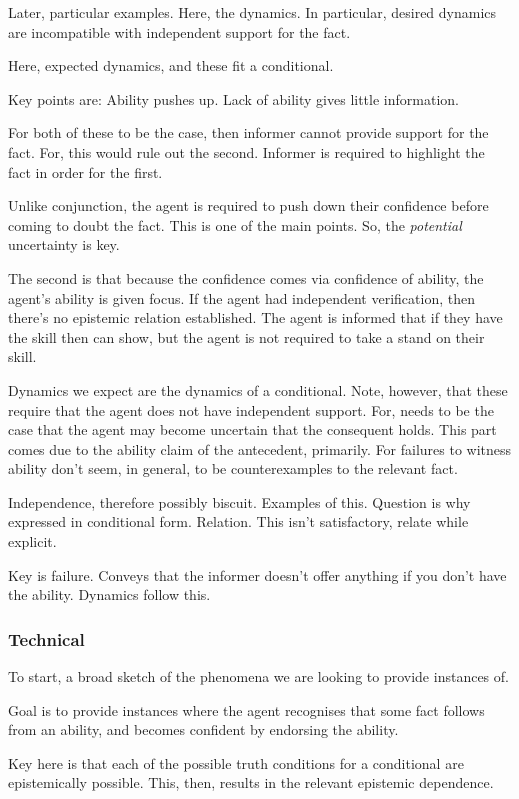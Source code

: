 \documentclass[10pt]{article}
\begin{document}
Later, particular examples.
Here, the dynamics.
In particular, desired dynamics are incompatible with independent support for the fact.

Here, expected dynamics, and these fit a conditional.

Key points are:
Ability pushes up.
Lack of ability gives little information.

For both of these to be the case, then informer cannot provide support for the fact.
For, this would rule out the second.
Informer is required to highlight the fact in order for the first.

Unlike conjunction, the agent is required to push down their confidence before coming to doubt the fact.
This is one of the main points.
So, the \emph{potential} uncertainty is key.

The second is that because the confidence comes via confidence of ability, the agent's ability is given focus.
If the agent had independent verification, then there's no epistemic relation established.
The agent is informed that if they have the skill then can show, but the agent is not required to take a stand on their skill.

Dynamics we expect are the dynamics of a conditional.
Note, however, that these require that the agent does not have independent support.
For, needs to be the case that the agent may become uncertain that the consequent holds.
This part comes due to the ability claim of the antecedent, primarily.
For failures to witness ability don't seem, in general, to be counterexamples to the relevant fact.

Independence, therefore possibly biscuit.
Examples of this.
Question is why expressed in conditional form.
Relation.
This isn't satisfactory, relate while explicit.

Key is failure.
Conveys that the informer doesn't offer anything if you don't have the ability.
Dynamics follow this.

\subsubsection{Technical}
\label{sec:technical}

To start, a broad sketch of the phenomena we are looking to provide instances of.

Goal is to provide instances where the agent recognises that some fact follows from an ability, and becomes confident by endorsing the ability.

Key here is that each of the possible truth conditions for a conditional are epistemically possible.
This, then, results in the relevant epistemic dependence.
\end{document}
